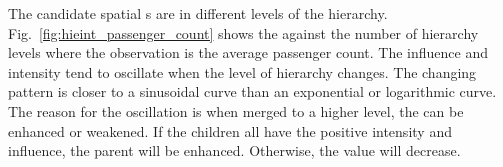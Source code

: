 The candidate spatial {\explanation}s are in different levels of the hierarchy. 
Fig.~\ref{fig:hieint_passenger_count} shows the {\influence} against the number of hierarchy levels where the observation is the average passenger count. 
The influence and intensity tend to oscillate when the level of hierarchy changes.
The changing pattern is closer to a sinusoidal curve than an exponential or logarithmic curve. 
The reason for the oscillation is when merged to a higher level, the {\explanation} can be enhanced or weakened. 
If the children {\explanation} all have the positive intensity and influence, the parent {\explanation} will be enhanced. 
Otherwise, the value will decrease. 



